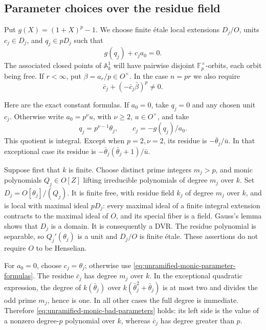 \subsection{Parameter choices over the residue field}

Put \(g(X)=(1+X)^p-1\).  We choose finite \'etale local extensions
\(D_j/O\), units \(c_j\in D_j\), and \(q_j\in pD_j\) such that
\begin{equation}\label{eq:singular-monic-constant-root}
 g(q_j)+c_ja_0=0.
\end{equation}
The associated closed points of \(\mathbb A^1_k\) will have
pairwise disjoint \(\mathbb F_p^\times\)-orbits, each orbit being
free.  If \(r<\infty\), put \(\beta=a_r/p\in O^\times\).
In the case \(n=pr\) we also require
\begin{equation}\label{eq:unramified-monic-bad-parameters}
 \bar c_j+(-\bar c_j\bar\beta)^p\ne0.
\end{equation}

Here are the exact constant formulas.  If \(a_0=0\), take
\(q_j=0\) and any chosen unit \(c_j\).  Otherwise write
\(a_0=p^\nu u\), with \(\nu\ge2\), \(u\in O^\times\), and take
\begin{equation}\label{eq:unramified-monic-parameter-formulas}
 q_j=p^{\nu-1}\theta_j,\qquad c_j=-g(q_j)/a_0.
\end{equation}
This quotient is integral.  Except when \(p=2,\nu=2\), its residue
is \(-\bar\theta_j/\bar u\).  In that exceptional case its residue
is \(-\bar\theta_j(\bar\theta_j+1)/\bar u\).

Suppose first that \(k\) is finite.  Choose distinct prime integers
\(m_j>p\), and monic polynomials \(Q_j\in O[Z]\) lifting
irreducible polynomials of degree \(m_j\) over \(k\).  Set
\(D_j=O[\theta_j]/(Q_j)\).  It is finite free, with residue field
\(k_j\) of degree \(m_j\) over \(k\), and is local with maximal
ideal \(pD_j\): every maximal ideal of a finite integral extension
contracts to the maximal ideal of \(O\), and its special fiber is
a field.  Gauss's lemma shows that \(D_j\) is a domain.
It is consequently a DVR.  The residue polynomial is separable,
so \(Q_j'(\theta_j)\) is a unit and \(D_j/O\) is finite \'etale.
These assertions do not require \(O\) to be Henselian.

For \(a_0=0\), choose \(c_j=\theta_j\); otherwise use
\eqref{eq:unramified-monic-parameter-formulas}.
The residue \(\bar c_j\) has degree \(m_j\) over \(k\).
In the exceptional quadratic expression, the degree of
\(k(\bar\theta_j)\) over \(k(\bar\theta_j^2+\bar\theta_j)\)
is at most two and divides the odd prime \(m_j\), hence is one.
In all other cases the full degree is immediate.  Therefore
\eqref{eq:unramified-monic-bad-parameters} holds: its left side is
the value of a nonzero degree-\(p\) polynomial over \(k\), whereas
\(\bar c_j\) has degree greater than \(p\).

